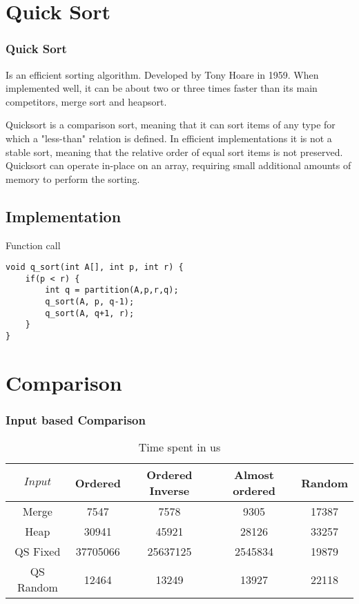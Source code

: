 \documentclass{beamer}
\begin{document}
\section{Quick Sort} 
\begin{frame}[fragile]
\frametitle{Quick Sort}

Is an efficient sorting algorithm. Developed by Tony Hoare in 1959. When implemented well, it can be about two or three times faster than its main competitors, merge sort and heapsort.

Quicksort is a comparison sort, meaning that it can sort items of any type for which a "less-than" relation is defined. In efficient implementations it is not a stable sort, meaning that the relative order of equal sort items is not preserved. Quicksort can operate in-place on an array, requiring small additional amounts of memory to perform the sorting.

\subsection{Implementation}
\begin{block}{Function call}
\begin{lstlisting}
void q_sort(int A[], int p, int r) {
    if(p < r) {
        int q = partition(A,p,r,q);
        q_sort(A, p, q-1);
        q_sort(A, q+1, r);
    }
}
\end{lstlisting}
\end{block}

\end{frame}

\section{Comparison}

\begin{frame}
\frametitle{Input based Comparison}
\begin{table}
\small
\begin{tabular}{| c | c | c | c | c  |}
\toprule
$Input$ & Ordered  & Ordered Inverse &  Almost ordered & Random \\ %
\midrule
 Merge       &  7547  & 7578  & 9305  & 17387   \\
 Heap       &  30941  & 45921  & 28126  & 33257   \\
 QS Fixed      &  37705066  &  25637125  &  2545834  & 19879   \\
 QS Random      &  12464  &  13249  &  13927  & 22118   \\
\bottomrule

\end{tabular}
\caption{Time spent in us}
\end{table}
\end{frame}
\end{document}
